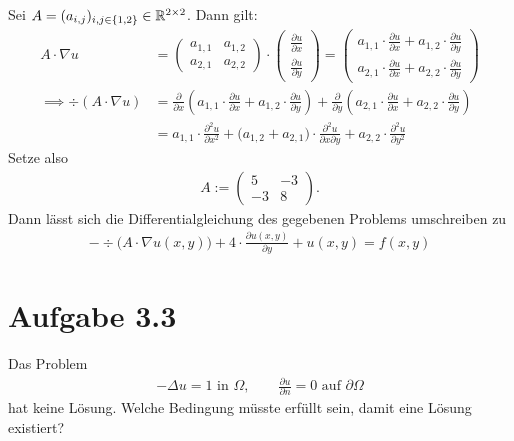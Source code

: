 \documentclass[12pt,a4paper]{article}
\begin{document}
\begin{lösung}
Sei $A=(a_{i,j})_{i,j\in\lbrace1,2\rbrace}\in\mathbb{R}^{2\times 2}$. Dann gilt:
\begin{align*}
A\cdot\nabla u&=\begin{pmatrix}
 a_{1,1} & a_{1,2}\\
 a_{2,1} & a_{2,2}
\end{pmatrix}\cdot\begin{pmatrix}
\frac{\partial u}{\partial x}\\
\frac{\partial u}{\partial y}
\end{pmatrix}=\begin{pmatrix}
a_{1,1}\cdot\frac{\partial u}{\partial x}+a_{1,2}\cdot\frac{\partial u}{\partial y}\\
a_{2,1}\cdot\frac{\partial u}{\partial x}+a_{2,2}\cdot\frac{\partial u}{\partial y}
\end{pmatrix}\\
\implies
\div(A\cdot\nabla u)&=\frac{\partial}{\partial x}\left(a_{1,1}\cdot\frac{\partial u}{\partial x}+a_{1,2}\cdot\frac{\partial u}{\partial y}\right)+\frac{\partial}{\partial y}\left(a_{2,1}\cdot\frac{\partial u}{\partial x}+a_{2,2}\cdot\frac{\partial u}{\partial y}\right)\\
&=a_{1,1}\cdot\frac{\partial^2 u}{\partial x^2}+\big(a_{1,2}+a_{2,1}\big)\cdot\frac{\partial^2 u}{\partial x\partial y}+a_{2,2}\cdot\frac{\partial^2 u}{\partial y^2}
\end{align*}
Setze also 
\begin{align*}
A:=\begin{pmatrix}
5 & -3\\
-3 & 8
\end{pmatrix}.
\end{align*}
Dann lässt sich die Differentialgleichung des gegebenen Problems umschreiben zu 
\begin{align*}
-\div\big(A\cdot\nabla u(x,y)\big)+4\cdot\frac{\partial u(x,y)}{\partial y}+u(x,y)=f(x,y)
\end{align*}
\end{lösung}

\section*{Aufgabe 3.3}
Das Problem 
\begin{align*}
-\Delta u=1\text{ in }\Omega,\qquad\frac{\partial u}{\partial n}=0\text{ auf }\partial\Omega
\end{align*}
hat keine Lösung. Welche Bedingung müsste erfüllt sein, damit eine Lösung existiert?
\end{document}
